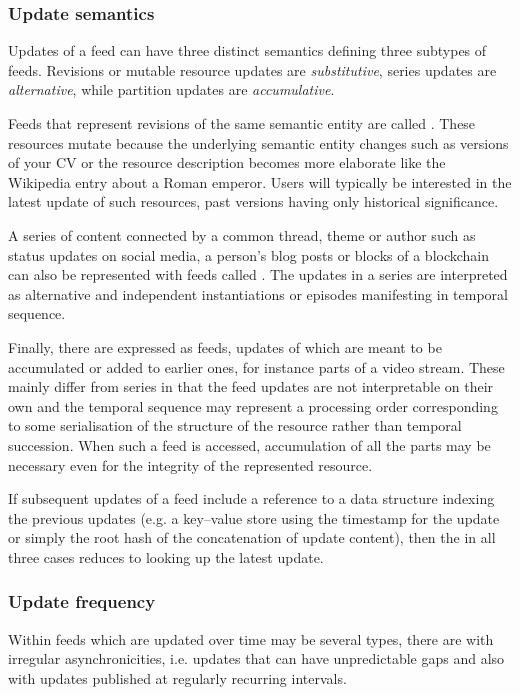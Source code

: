 \subsubsection{Update semantics}

Updates of a feed can have three distinct semantics defining three subtypes of feeds. 
Revisions or mutable resource updates are \emph{substitutive}, series updates are \emph{alternative}, while partition updates are \emph{accumulative}. 

Feeds that represent revisions of the same semantic entity are called . These resources mutate because the underlying semantic entity changes such as versions of your CV or the resource description becomes more elaborate like the Wikipedia entry about a Roman emperor. Users will typically be interested in the latest update of such resources, past versions having only historical significance. 

A series of content connected by a common thread, theme or author such as status updates on social media, a person's blog posts or blocks of a blockchain can also be represented with feeds called .
The updates in a series are interpreted as alternative and independent instantiations or episodes manifesting in temporal sequence. 

Finally, there are  expressed as feeds, updates of which are meant to be accumulated or added to earlier ones, for instance parts of a video stream. These mainly differ from series in that the feed updates are not interpretable on their own and the temporal sequence may represent a processing order corresponding to some serialisation of the structure of the resource rather than temporal succession. When such a feed is accessed, accumulation of all the parts may be necessary even for the integrity of the represented resource.

If subsequent updates of a feed include a reference to a data structure indexing the previous updates (e.g. a key--value store using the timestamp for the update or simply the root hash of the concatenation of update content), then the  in all three cases reduces to looking up the latest update.

\subsubsection{Update frequency}

Within feeds which are updated over time may be several types, there are  with irregular asynchronicities, i.e. updates that can have unpredictable gaps and also  with updates published at regularly recurring intervals.

